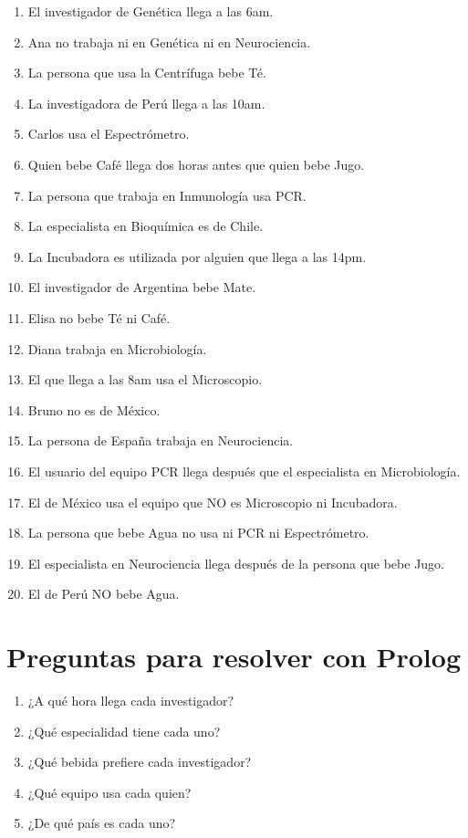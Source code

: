 \documentclass[11pt]{article}
\begin{document}
\begin{enumerate}
\item El investigador de Genética llega a las 6am.
\item Ana no trabaja ni en Genética ni en Neurociencia.
\item La persona que usa la Centrífuga bebe Té.
\item La investigadora de Perú llega a las 10am.
\item Carlos usa el Espectrómetro.
\item Quien bebe Café llega dos horas antes que quien bebe Jugo.
\item La persona que trabaja en Inmunología usa PCR.
\item La especialista en Bioquímica es de Chile.
\item La Incubadora es utilizada por alguien que llega a las 14pm.
\item El investigador de Argentina bebe Mate.
\item Elisa no bebe Té ni Café.
\item Diana trabaja en Microbiología.
\item El que llega a las 8am usa el Microscopio.
\item Bruno no es de México.
\item La persona de España trabaja en Neurociencia.
\item El usuario del equipo PCR llega después que el especialista en Microbiología.
\item El de México usa el equipo que NO es Microscopio ni Incubadora.
\item La persona que bebe Agua no usa ni PCR ni Espectrómetro.
\item El especialista en Neurociencia llega después de la persona que bebe Jugo.
\item El de Perú NO bebe Agua.
\end{enumerate}

\section*{Preguntas para resolver con Prolog}
\label{sec:org672f70b}

\begin{enumerate}
\item ¿A qué hora llega cada investigador?
\item ¿Qué especialidad tiene cada uno?
\item ¿Qué bebida prefiere cada investigador?
\item ¿Qué equipo usa cada quien?
\item ¿De qué país es cada uno?
\end{enumerate}
\end{document}
